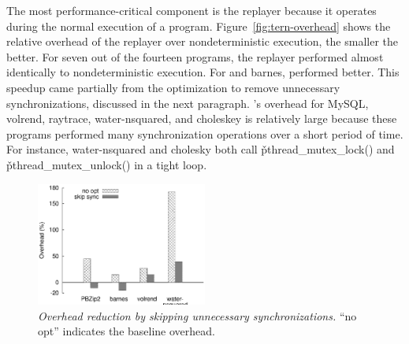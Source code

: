 
The most performance-critical component is the replayer because it
operates during the normal execution of a program.
Figure~\ref{fig:tern-overhead} shows the relative overhead of the replayer over
nondeterministic execution, the smaller the better.  For seven out of
the fourteen programs, the replayer performed almost identically to
nondeterministic execution. For \pbzip and barnes, \tern performed
better.  This speedup came partially from the optimization to remove
unnecessary synchronizations, discussed in the next paragraph.  \tern's overhead
for MySQL, volrend, raytrace, water-nsquared, and choleskey is relatively
large because these programs performed many synchronization operations
over a short period of time.  For instance, water-nsquared and cholesky
both call \v{pthread\_mutex\_lock()} and \v{pthread\_mutex\_unlock()} in a
tight loop.



\begin{figure}[t]
\centering
\includegraphics[width=0.5\textwidth]{tern/figures/opt-overhead}
\caption{\small {\em Overhead reduction by skipping unnecessary
    synchronizations.} ``no opt'' indicates the baseline overhead.}
\label{fig:tern-opt-remove-sync}
\end{figure}

